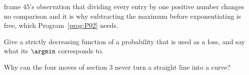 \begin{furtherproblems}
{  frame $45$'s observation that dividing every entry by one positive number
  changes no comparison \dash{} and it is why subtracting the maximum before
  exponentiating is free, which Program~\ref{prog:P02} needs.}
\item Give a strictly decreasing function of a probability that is used as a
  loss, and say what its $\argmin$ corresponds to.
\item Why can the four moves of section 3 never turn a straight line into a
  curve?
\end{furtherproblems}
